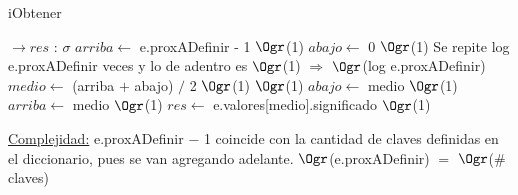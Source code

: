 \begin{Representacion}
	\begin{algorithm}[H]
		\caption{iObtener}
		\begin{algorithmic}
			 $\to res$ : $\sigma$
				\State $arriba \gets$ e.proxADefinir - 1 \Comment $\Ogr$(1)
				\State $abajo \gets$ 0 \Comment $\Ogr$(1)
				 \Comment Se repite log e.proxADefinir veces y lo de adentro es $\Ogr$(1) $\Rightarrow$ $\Ogr$(log e.proxADefinir)
					\State $	medio \gets$ (arriba $+$ abajo) $/$ 2 \Comment $\Ogr$(1)
					 \Comment $\Ogr$(1)
						\State $abajo \gets$ medio \Comment $\Ogr$(1)
					\Else
						\State $arriba \gets$ medio \Comment $\Ogr$(1)
					\EndIf
				\EndWhile
				\State $res \gets$ e.valores[medio].significado \Comment $\Ogr$(1)
			\EndProcedure
		\end{algorithmic}
		\underline{Complejidad:} e.proxADefinir $-$ 1 coincide con la cantidad de claves definidas en el diccionario, pues se van agregando adelante. $\Ogr$(e.proxADefinir) $=$ $\Ogr$($\#$claves)
	\end{algorithm}
	
\end{Representacion}